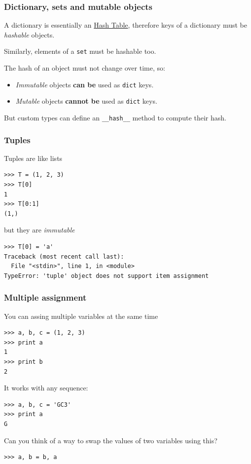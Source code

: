 \documentclass[english,serif,mathserif,xcolor=pdftex,dvipsnames,table]{beamer}
\begin{document}
\begin{frame}[fragile]
  \frametitle{Dictionary, sets and mutable objects} 

  A dictionary is essentially an
  \href{http://en.wikipedia.org/wiki/Hash_table}{Hash Table}, therefore keys of a
  dictionary must be \textit{hashable} objects.

  \+
  Similarly, elements of a \texttt{set} must be hashable too.

  \+\pause
  The hash of an object must not change over time, so:

  \begin{itemize}
  \pause
    \item
      \textit{Immutable} objects \textbf{can be} used as \texttt{dict} keys.
      
  \pause
    \item
      \textit{Mutable} objects  \textbf{cannot be} used as \texttt{dict} keys.
    \end{itemize}
    
    \+\pause
  But custom types can define an \verb|__hash__| method to compute their
  hash.
\end{frame}



\begin{frame}[fragile]
  \frametitle{Tuples}
  Tuples are like lists
  \begin{lstlisting}
>>> T = (1, 2, 3)
>>> T[0]
1
>>> T[0:1]
(1,)
  \end{lstlisting}

  \+\pause
but they are \textit{immutable}

\begin{lstlisting}[basicstyle=\footnotesize\ttfamily]
>>> T[0] = 'a'
Traceback (most recent call last):
  File "<stdin>", line 1, in <module>
TypeError: 'tuple' object does not support item assignment
\end{lstlisting}
\end{frame}


\begin{frame}[fragile]
\frametitle{Multiple assignment}
You can assing multiple variables at the same time
\begin{lstlisting}
>>> a, b, c = (1, 2, 3)
>>> print a
1
>>> print b
2
\end{lstlisting}

\+

It works with any sequence:

\begin{lstlisting}
>>> a, b, c = 'GC3'
>>> print a
G
\end{lstlisting}

\pause
\begin{question}
  Can you think of a way to swap the values of two variables using this?
\end{question}
\pause
\begin{lstlisting}
>>> a, b = b, a
\end{lstlisting}
\end{frame}
\end{document}
